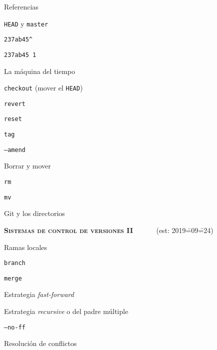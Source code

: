 \begin{longenum}
\begin{longenum}
\begin{longenum}
\begin{longenum}
            \end{longenum}
            \item Referencias
            \begin{longenum}
                \item \texttt{HEAD} y \texttt{master}
                \item \texttt{237ab45\^}
                \item \texttt{237ab45~1}
            \end{longenum}
        \end{longenum}
        \item La máquina del tiempo
        \begin{longenum}
            \item \texttt{checkout} (mover el \texttt{HEAD})
            \item \texttt{revert}
            \item \texttt{reset}
            \item \texttt{tag}
            \item \texttt{--amend}
        \end{longenum}
        \item Borrar y mover
        \begin{longenum}
            \item \texttt{rm}
            \item \texttt{mv}
        \end{longenum}
        \item Git y los directorios
    \end{longenum}
    \item \textbf{\textsc{Sistemas de control de versiones II}} \ \ \ \ \ \ (est: 2019\==09\==24)
    \begin{longenum}
        \item Ramas locales
        \begin{longenum}
            \item \texttt{branch}
            \item \texttt{merge}
            \begin{longenum}
                \item Estrategia \textit{fast-forward}
                \item Estrategia \textit{recursive} o del padre múltiple
                \item \texttt{--no-ff}
            \end{longenum}
            \item Resolución de conflictos

\end{longenum}
\end{longenum}
\end{longenum}
